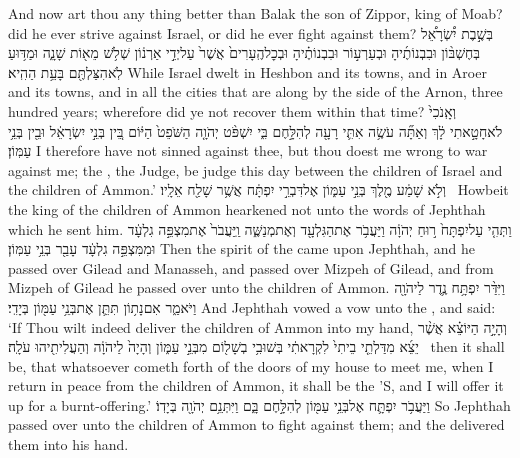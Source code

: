 {And now art thou any thing better than Balak the son of Zippor, king of Moab? did he ever strive against Israel, or did he ever fight against them?}
{בְּשֶׁ֣בֶת יִ֠שְׂרָאֵ֠ל בְּחֶשְׁבּ֨וֹן וּבִבְנוֹתֶ֜יהָ וּבְעַרְע֣וֹר וּבִבְנוֹתֶ֗יהָ וּבְכׇל\maqqaf הֶֽעָרִים֙ אֲשֶׁר֙ עַל\maqqaf יְדֵ֣י אַרְנ֔וֹן שְׁלֹ֥שׁ מֵא֖וֹת שָׁנָ֑ה וּמַדּ֥וּעַ לֹֽא\maqqaf הִצַּלְתֶּ֖ם בָּעֵ֥ת הַהִֽיא׃}
{While Israel dwelt in Heshbon and its towns, and in Aroer and its towns, and in all the cities that are along by the side of the Arnon, three hundred years; wherefore did ye not recover them within that time?}
{וְאָֽנֹכִי֙ לֹא\maqqaf חָטָ֣אתִי לָ֔ךְ וְאַתָּ֞ה עֹשֶׂ֥ה אִתִּ֛י רָעָ֖ה לְהִלָּ֣חֶם בִּ֑י יִשְׁפֹּ֨ט יְהֹוָ֤ה הַשֹּׁפֵט֙ הַיּ֔וֹם בֵּ֚ין בְּנֵ֣י יִשְׂרָאֵ֔ל וּבֵ֖ין בְּנֵ֥י עַמּֽוֹן׃}
{I therefore have not sinned against thee, but thou doest me wrong to war against me; the \lord, the Judge, be judge this day between the children of Israel and the children of Ammon.’}
{וְלֹ֣א שָׁמַ֔ע מֶ֖לֶךְ בְּנֵ֣י עַמּ֑וֹן אֶל\maqqaf דִּבְרֵ֣י יִפְתָּ֔ח אֲשֶׁ֥ר שָׁלַ֖ח אֵלָֽיו׃ \petucha }
{Howbeit the king of the children of Ammon hearkened not unto the words of Jephthah which he sent him.}
{וַתְּהִ֤י עַל\maqqaf יִפְתָּח֙ ר֣וּחַ יְהֹוָ֔ה וַיַּעֲבֹ֥ר אֶת\maqqaf הַגִּלְעָ֖ד וְאֶת\maqqaf מְנַשֶּׁ֑ה וַֽיַּעֲבֹר֙ אֶת\maqqaf מִצְפֵּ֣ה גִלְעָ֔ד וּמִמִּצְפֵּ֣ה גִלְעָ֔ד עָבַ֖ר בְּנֵ֥י עַמּֽוֹן׃}
{Then the spirit of the \lord\space came upon Jephthah, and he passed over Gilead and Manasseh, and passed over Mizpeh of Gilead, and from Mizpeh of Gilead he passed over unto the children of Ammon.}
{וַיִּדַּ֨ר יִפְתָּ֥ח נֶ֛דֶר לַיהֹוָ֖ה וַיֹּאמַ֑ר אִם\maqqaf נָת֥וֹן תִּתֵּ֛ן אֶת\maqqaf בְּנֵ֥י עַמּ֖וֹן בְּיָדִֽי׃}
{And Jephthah vowed a vow unto the \lord, and said: ‘If Thou wilt indeed deliver the children of Ammon into my hand,}
{וְהָיָ֣ה הַיּוֹצֵ֗א אֲשֶׁ֨ר יֵצֵ֜א מִדַּלְתֵ֤י בֵיתִי֙ לִקְרָאתִ֔י בְּשׁוּבִ֥י בְשָׁל֖וֹם מִבְּנֵ֣י עַמּ֑וֹן וְהָיָה֙ לַיהֹוָ֔ה וְהַעֲלִיתִ֖יהוּ עֹלָֽה׃ \petucha }
{then it shall be, that whatsoever cometh forth of the doors of my house to meet me, when I return in peace from the children of Ammon, it shall be the \lord’S, and I will offer it up for a burnt-offering.’}
{וַיַּעֲבֹ֥ר יִפְתָּ֛ח אֶל\maqqaf בְּנֵ֥י עַמּ֖וֹן לְהִלָּ֣חֶם בָּ֑ם וַיִּתְּנֵ֥ם יְהֹוָ֖ה בְּיָדֽוֹ׃}
{So Jephthah passed over unto the children of Ammon to fight against them; and the \lord\space delivered them into his hand.}
